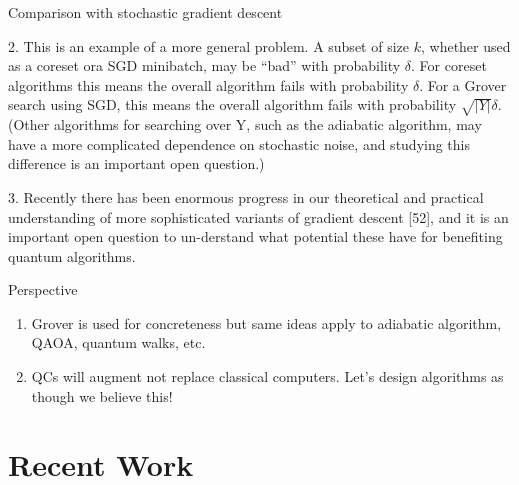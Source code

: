 \documentclass[
  ignorenonframetext,
]{beamer}
\begin{document}
\begin{frame}{Comparison with stochastic gradient descent}
\protect\hypertarget{comparison-with-stochastic-gradient-descent-1}{}
\begin{small}

2.  This is an example of a more general problem.  A subset of size $k$, whether used as a coreset ora SGD minibatch, may be “bad” with probability $\delta$.  For coreset algorithms this means the overall algorithm fails with probability $\delta$.  For a Grover search using SGD, this means the overall algorithm fails with probability  $\sqrt{|Y|} \delta$.  (Other algorithms for searching over Y, such as the adiabatic algorithm, may have a more complicated dependence on stochastic noise, and studying this difference is an important open question.)

3. Recently there has been enormous progress in our theoretical and practical understanding of more sophisticated variants of gradient descent [52], and it is an important open question to un-derstand what potential these have for benefiting quantum algorithms.

\end{small}
\end{frame}

\begin{frame}{Perspective}
\protect\hypertarget{perspective}{}
\begin{enumerate}
\item
  Grover is used for concreteness but same ideas apply to adiabatic
  algorithm, QAOA, quantum walks, etc.
\item
  QCs will augment not replace classical computers. Let's design
  algorithms as though we believe this!
\end{enumerate}
\end{frame}

\hypertarget{recent-work}{%
\section{Recent Work}\label{recent-work}}
\end{document}
